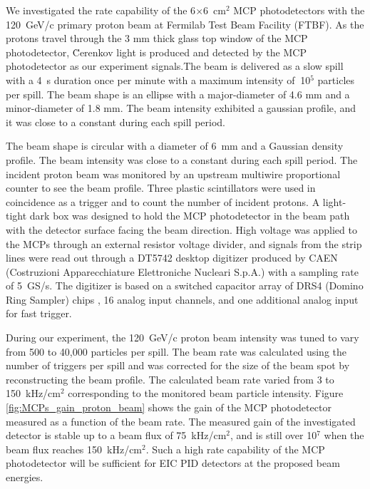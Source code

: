 \documentclass[preprint,5p]{elsarticle}
\begin{document}
We investigated the rate capability of the 6$\times$6~cm$^2$ MCP photodetectors 
with the 120~GeV/c primary proton beam at Fermilab Test Beam Facility (FTBF).  
As the protons travel through the 3 mm thick glass top window of the MCP 
photodetector, \u Cerenkov light is produced and detected by the MCP 
photodetector as our experiment signals.The beam is delivered as a slow spill 
with a 4~s duration once per minute with a maximum intensity of $~$10$^5$ 
particles per spill. The beam shape is an ellipse with a major-diameter of 4.6 
mm and a minor-diameter of 1.8 mm. The beam intensity exhibited a gaussian 
profile, and it was close to a constant during each spill period. 

The beam shape is 
circular with a diameter of 6~mm and a Gaussian density profile.  The beam 
intensity was close to a constant during each spill period. The incident proton 
beam was monitored by an upstream multiwire proportional counter to see the 
beam profile. Three plastic scintillators were used in coincidence as a trigger 
and to count the number of incident protons. A light-tight dark box was 
designed to hold the MCP photodetector in the beam path with the detector 
surface facing the beam direction. High voltage was applied to the MCPs through 
an external resistor voltage divider, and signals from the strip lines were 
read out through a DT5742 desktop digitizer \cite{Digitizer} produced by CAEN 
(Costruzioni Apparecchiature Elettroniche Nucleari S.p.A.) with a sampling rate 
of 5~GS/s. The digitizer is based on a switched capacitor array of DRS4 (Domino 
Ring Sampler) chips \cite{DRS}, 16 analog input channels, and one additional 
analog input for fast trigger.

During our experiment, the 120~GeV/c proton beam intensity was tuned to vary 
from 500 to 40,000 particles per spill. The beam rate was calculated using the 
number of triggers per spill and was corrected for the size of the beam spot by 
reconstructing the beam profile. The calculated beam rate varied from 3 to 
150~kHz/cm$^2$ corresponding to the monitored beam particle intensity. Figure 
\ref{fig:MCPs_gain_proton_beam} shows the gain of the MCP photodetector 
measured as a function of the beam rate. The measured gain of the investigated 
detector is stable up to a beam flux of 75~kHz/cm$^2$, and is still over 10$^7$ 
when the beam flux reaches 150~kHz/cm$^2$. Such a high rate capability of the 
MCP photodetector will be sufficient for EIC PID detectors at the proposed beam 
energies.
\end{document}
